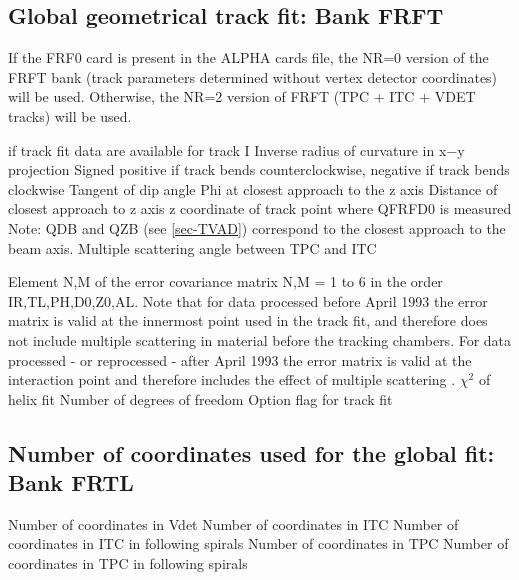 \subsection{\label{sec-TVAFRFT}Global geometrical track fit: Bank
FRFT}
\par
\par If the FRF0 card is present in the ALPHA cards file, the NR=0
version of the FRFT bank (track parameters determined without vertex
detector coordinates) will be used.  Otherwise, the NR=2 version
of FRFT (TPC + ITC + VDET tracks) will be used.
\par
\begin{indentlist}{ 3.00cm}{ 3.25cm}
 if track fit data are available
for track I
Inverse radius of curvature in x$-$y projection
Signed positive if track bends counterclockwise, negative
if track bends clockwise
Tangent of dip angle
Phi at closest approach to the z axis
Distance of closest approach to z axis
z coordinate of track point where QFRFD0 is
measured
Note: QDB and QZB (see \ref{sec-TVAD})
correspond to the closest approach to the beam axis.
Multiple scattering angle between TPC and ITC
 
Element N,M of the error covariance matrix
N,M = 1 to 6 in the order IR,TL,PH,D0,Z0,AL.
Note that for data processed before April 1993 the error matrix is valid at the innermost
point used in the track fit, and therefore does not include
multiple scattering in material before the tracking chambers.
For data processed - or reprocessed - after April 1993 the error matrix is valid at the interaction point
and therefore includes the effect of multiple scattering .
$\chi^2$ of helix fit
Number of degrees of freedom
Option flag for track fit
\end{indentlist}
 
\subsection{\label{sec-TVAFRTL}Number of coordinates used for the
global fit: Bank FRTL}
\par
\begin{indentlist}{ 3.00cm}{ 3.25cm}
Number of coordinates in Vdet
Number of coordinates in ITC
Number of coordinates in ITC in following spirals
Number of coordinates in TPC
Number of coordinates in TPC in following spirals
\end{indentlist}
